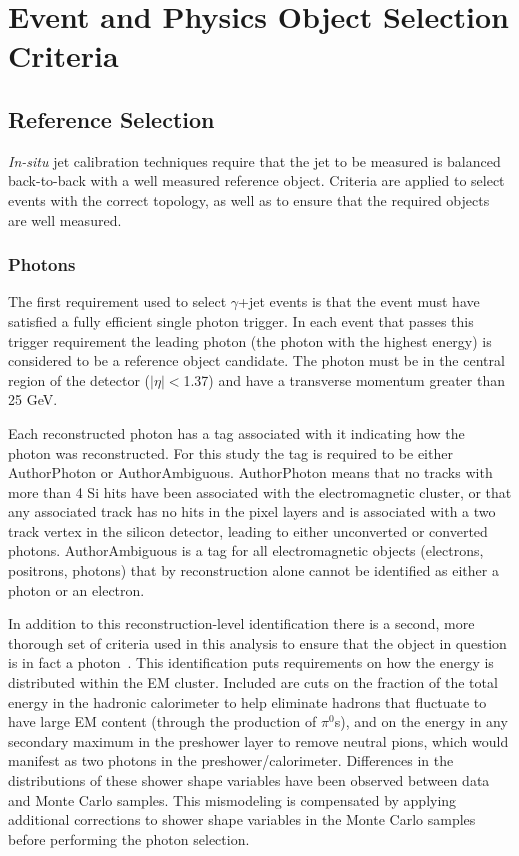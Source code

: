 \section{Event and Physics Object Selection Criteria}
\label{Sec:SelectionCriteria}
\subsection{Reference Selection}
\textit{In-situ} jet calibration techniques require that the jet to be measured is balanced back-to-back with a well measured reference object.  
Criteria are applied to select events with the correct topology, as well as to ensure that the required objects are well measured.  

\subsubsection{Photons}
\label{Sec:Photons}
The first requirement used to select $\gamma$+jet events is that the event must have satisfied a fully efficient single photon trigger.  
In each event that passes this trigger requirement the leading photon (the photon with the highest energy) is considered to be a reference object candidate.  
The photon must be in the central region of the detector ($\mid\eta\mid<$1.37) and have a transverse momentum greater than 25 GeV.  

Each reconstructed photon has a tag associated with it indicating how the photon was reconstructed.  
For this study the tag is required to be either AuthorPhoton or AuthorAmbiguous.  
AuthorPhoton means that no tracks with more than 4 Si hits have been associated with the electromagnetic cluster, or that any associated track has no hits in the pixel layers and is associated with a two track vertex in the silicon detector, leading to either unconverted or converted photons.  
AuthorAmbiguous is a tag for all electromagnetic objects (electrons, positrons, photons) that by reconstruction alone cannot be identified as either a photon or an electron.  

In addition to this reconstruction-level identification there is a second, more thorough set of criteria used in this analysis to ensure that the object in question is in fact a photon~\cite{ATL-PHYS-PUB-2016-014}.  
This identification puts requirements on how the energy is distributed within the EM cluster.  
Included are cuts on the fraction of the total energy in the hadronic calorimeter to help eliminate hadrons that fluctuate to have large EM content (through the production of $\pi^0$s), and on the energy in any secondary maximum in the preshower layer to remove neutral pions, which would manifest as two photons in the preshower/calorimeter.  
Differences in the distributions of these shower shape variables have been observed between data and Monte Carlo samples.  
This mismodeling is compensated by applying additional corrections to shower shape variables in the Monte Carlo samples before performing the photon selection.  

